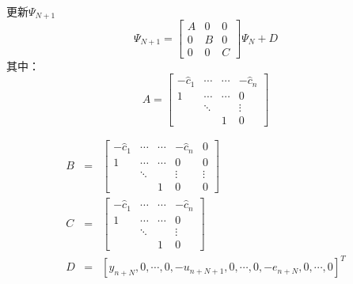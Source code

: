 \begin{frame}{更新$\Psi_{N+1}$}
$$
\Psi_{N+1}=
\begin{bmatrix}
A  & 0 & 0 \\
0  & B & 0 \\
0  & 0 & C
\end{bmatrix}
\Psi_N+ D
$$
其中：
$$
A=\begin{bmatrix}
-\hat c_1 & \cdots & \cdots & -\hat c_n  \\
1         & \cdots & \cdots &  0          \\
          & \ddots &        &  \vdots     \\
          &        &   1    &   0       
\end{bmatrix}
$$
\end{frame}
\begin{frame}
\begin{eqnarray*}
B &=& \begin{bmatrix}
-\hat c_1 & \cdots & \cdots & -\hat c_n &  0     \\
  1         & \cdots & \cdots &  0      &  0     \\
            & \ddots &        &  \vdots & \vdots \\
            &        &   1    &   0     &  0    
\end{bmatrix} \\
C &=& \begin{bmatrix}
-\hat c_1 & \cdots & \cdots & -\hat c_n \\
  1       & \cdots & \cdots &  0    \\
          & \ddots &        &  \vdots  \\
           &       &   1    &   0   
\end{bmatrix}\\
D &=& [ y_{n+N} ,  0 , \cdots , 0 ,  -u_{n+N+1} , 0 ,  \cdots ,  0 ,-e_{n+N} , 0 , \cdots , 0 ]^T
\end{eqnarray*}
\end{frame}
